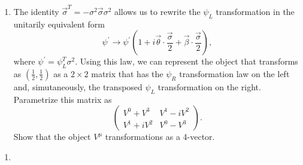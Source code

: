 \begin{enumerate}[label = {(\alph*)}, ref = {(\alph*)}]
    \item The identity $\vec{\sigma}^T = -\sigma^2 \vec{\sigma}\sigma^2$ allows us to rewrite the $\psi_L$ transformation in the 
    unitarily equivalent form
    \begin{equation*}
        \psi^\prime \to \psi^\prime \left(1 + i\vec{\theta}\cdot\frac{\vec{\sigma}}{2} + \vec{\beta}\cdot\frac{\vec{\sigma}}{2}\right),
    \end{equation*}
    where $\psi^\prime = \psi_L^T \sigma^2$. Using this law, we can represent the object that transforms as $(\frac{1}{2}, \frac{1}{2})$
    as a $2 \times 2$ matrix that has the $\psi_R$ transformation law on the left and, simutaneously, the transposed $\psi_L$ transformation
    on the right. Parametrize this matrix as
    \begin{equation*}
        \begin{pmatrix}
            V^0 + V^3  & V^1 - iV^2 \\
            V^1 + iV^2 & V^0 - V^3
        \end{pmatrix}.
    \end{equation*}
    Show that the object $V^\mu$ transformations as a 4-vector.
\end{enumerate}

\solution
\begin{enumerate}[label = {(\alph*)}]
    \item 
\end{enumerate}